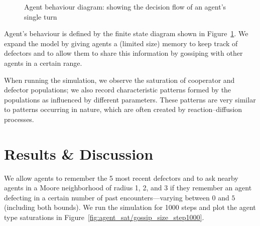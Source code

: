 \documentclass[runningheads]{llncs}
\begin{document}
\begin{figure}[h]
  \centering
  \caption{Agent behaviour diagram: showing the decision flow of an agent's single turn}
  \label{fig:agent_behaviour}
\end{figure}

Agent's behaviour is defined by the finite state diagram shown in Figure~\ref{fig:agent_behaviour}.
We expand the model by giving agents a (limited size) memory to keep track of defectors and to allow them to share this information by gossiping with other agents in a certain range.

When running the simulation, we observe the saturation of cooperator and defector populations; we also record characteristic patterns \cite{spatial-patterns} formed by the populations as influenced by different parameters.
These patterns are very similar to patterns occurring in nature, which are often created by reaction--diffusion processes.
%
%
%
\section{Results \& Discussion}
We allow agents to remember the 5 most recent defectors and to ask nearby agents in a Moore neighborhood of radius 1, 2, and 3 if they remember an agent defecting in a certain number of past encounters---varying between $0$ and $5$ (including both bounds).
We run the simulation for 1000 steps and plot the agent type saturations in Figure~\ref{fig:agent_sat/gossip_size_step1000}.
\end{document}
